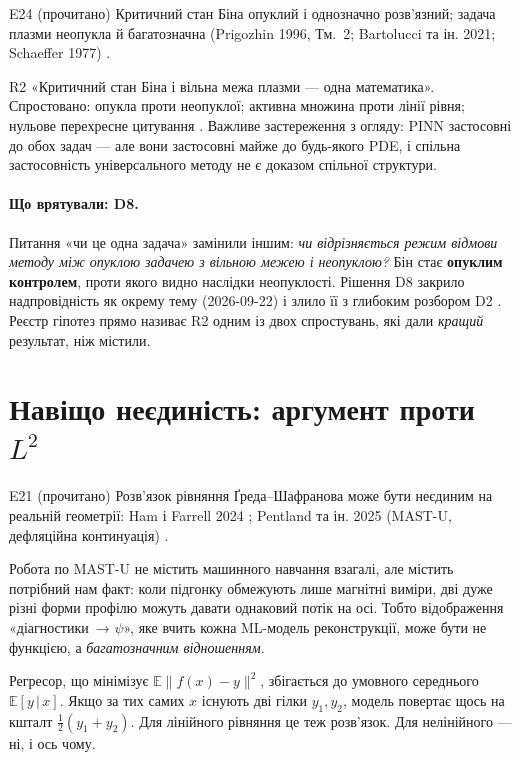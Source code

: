 \begin{established}{E24 (прочитано)}
Критичний стан Біна опуклий і однозначно розв'язний; задача плазми неопукла й
багатозначна (Prigozhin 1996, Тм.~2; Bartolucci та ін. 2021; Schaeffer 1977) \cite{RegEst}.
\end{established}
\begin{refuted}{R2}
«Критичний стан Біна і вільна межа плазми --- одна математика». Спростовано: опукла
проти неопуклої; активна множина проти лінії рівня; нульове перехресне цитування
\cite{RegEst}. Важливе застереження з огляду: PINN застосовні до обох задач --- але вони
застосовні майже до будь-якого PDE, і спільна застосовність універсального методу не є
доказом спільної структури.
\end{refuted}

\paragraph{Що врятували: D8.} Питання «чи це одна задача» замінили іншим: \emph{чи
відрізняється режим відмови методу між опуклою задачею з вільною межею і неопуклою?}
Бін стає \textbf{опуклим контролем}, проти якого видно наслідки неопуклості. Рішення D8
закрило надпровідність як окрему тему (2026-09-22) і злило її з глибоким розбором D2
\cite{RegDec}. Реєстр гіпотез прямо називає R2 одним із двох спростувань, які дали
\emph{кращий} результат, ніж містили.

\section{Навіщо неєдиність: аргумент проти \texorpdfstring{$L^2$}{L2}}\label{sec:g03-why}

\begin{established}{E21 (прочитано)}
Розв'язок рівняння Ґреда--Шафранова може бути неєдиним на реальній геометрії: Ham і
Farrell 2024 \cite{HamFarrell2024}; Pentland та ін. 2025 \cite{Pentland2025} (MAST-U,
дефляційна континуація) \cite{RegEst}.
\end{established}
\noindent Робота по MAST-U не містить машинного навчання взагалі, але містить потрібний
нам факт: коли підгонку обмежують лише магнітні виміри, дві дуже різні форми профілю
можуть давати однаковий потік на осі. Тобто відображення «діагностики~→ $\psi$», яке
вчить кожна ML-модель реконструкції, може бути не функцією, а \emph{багатозначним
відношенням}.

Регресор, що мінімізує $\mathbb{E}\|f(x)-y\|^2$, збігається до умовного середнього
$\mathbb{E}[y\,|\,x]$. Якщо за тих самих $x$ існують дві гілки $y_1,y_2$, модель
повертає щось на кшталт $\tfrac12(y_1+y_2)$. Для лінійного рівняння це теж розв'язок.
Для нелінійного --- ні, і ось чому.

